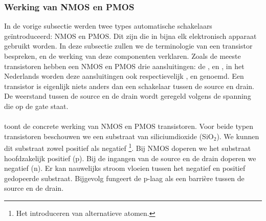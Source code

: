 \subsubsection{Werking van NMOS en PMOS}
In de vorige subsectie werden twee types automatische schakelaars ge\"introduceerd: NMOS en PMOS. Dit zijn  die in bijna elk elektronisch apparaat gebruikt worden. In deze subsectie zullen we de terminologie van een transistor bespreken, en de werking van deze componenten verklaren. Zoals de meeste transistoren hebben een NMOS en PMOS drie aansluitingen: de ,  en , in het Nederlands worden deze aansluitingen ook respectievelijk ,  en  genoemd. Een transistor is eigenlijk niets anders dan een schakelaar tussen de source en drain. De weerstand tussen de source en de drain wordt geregeld volgens de spanning die op de gate staat.

\paragraph{}
 toont de concrete werking van NMOS en PMOS transistoren. Voor beide typen transistoren beschouwen we een substraat van siliciumdioxide (SiO$_2$). We kunnen dit substraat zowel positief als negatief \footnote{Het introduceren van alternatieve atomen.}. Bij NMOS doperen we het substraat hoofdzakelijk positief (p). Bij de ingangen van de source en de drain doperen we negatief (n). Er kan nauwelijks stroom vloeien tussen het negatief en positief gedopeerde substraat. Bijgevolg fungeert de p-laag als een barri\`ere tussen de source en de drain.

